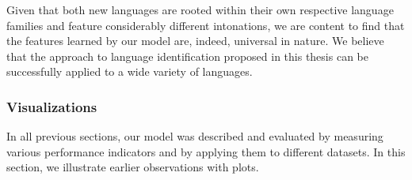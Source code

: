 Given that both new languages are rooted within their own respective language families and feature considerably different intonations, we are content to find that the features learned by our model are, indeed, universal in nature. We believe that the approach to language identification proposed in this thesis can be successfully applied to a wide variety of languages.

\subsubsection{Visualizations}
\label{sec:visualization}
In all previous sections, our model was described and evaluated by measuring various performance indicators and by applying them to different datasets. In this section, we illustrate earlier observations with plots.

